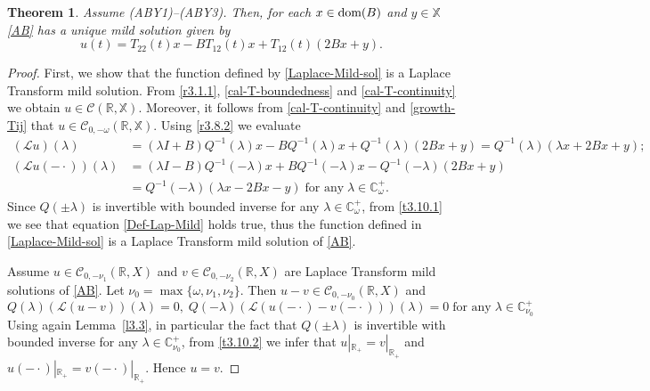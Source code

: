 \documentclass[11pt]{amsart}
\numberwithin{equation}{section}
\newtheorem{theorem}{Theorem}[section]
\theoremstyle{remark}
\theoremstyle{definition}
\newcommand\bX{{\mathbb X}}
\newcommand{\dom}{\text{\rm{dom}}}
\begin{document}
\begin{theorem}\label{t3.10}
	Assume \textnormal{(ABY1)--(ABY3)}. Then, for each $x \in \dom(B)$ and $y \in \bX$ \eqref{AB} has a unique mild solution given by
	\begin{equation}\label{Laplace-Mild-sol}
		u(t) = T_{22}(t)x - BT_{12}(t)x + T_{12}(t)(2Bx+y). 
	\end{equation}
\end{theorem}
\begin{proof}
First, we show that the function defined by \eqref{Laplace-Mild-sol} is a Laplace Transform mild solution. From \eqref{r3.1.1}, \eqref{cal-T-boundedness} and \eqref{cal-T-continuity} we obtain $u \in \mathcal{C}(\mathbb{R}, \bX)$. Moreover, it follows from \eqref{cal-T-continuity} and \eqref{growth-Tij} that $u \in \mathcal{C}_{0,-\omega}(\mathbb{R},\bX)$. Using \eqref{r3.8.2} we evaluate
\begin{align}\label{t3.10.1}
(\mathcal{L}u)(\lambda)
&= (\lambda I+B)Q^{-1}(\lambda)x - BQ^{-1}(\lambda)x + Q^{-1}(\lambda)(2Bx+y) = Q^{-1}(\lambda)(\lambda x + 2Bx + y);\nonumber\\ 
(\mathcal{L}u(-\cdot))(\lambda)
&= (\lambda I-B)Q^{-1}(-\lambda)x + BQ^{-1}(-\lambda)x - Q^{-1}(-\lambda)(2Bx+y)\nonumber\\&= Q^{-1}(-\lambda)(\lambda x - 2Bx - y)\;\mbox{for any}\;\lambda \in \mathbb{C}_\omega^+.
\end{align}
Since $Q(\pm\lambda)$ is invertible with bounded inverse for any $\lambda \in \mathbb{C}_\omega^+$, from \eqref{t3.10.1} we see that equation \eqref{Def-Lap-Mild} holds true, thus the function defined in \eqref{Laplace-Mild-sol} is a Laplace Transform mild solution of \eqref{AB}.
	
Assume $u \in \mathcal{C}_{0,-\nu_1}(\mathbb{R},X)$ and $v \in \mathcal{C}_{0,-\nu_2}(\mathbb{R},X)$ are Laplace Transform mild solutions of \eqref{AB}. Let $\nu_0 = \max\{\omega, \nu_1, \nu_2\}$. Then $u - v \in \mathcal{C}_{0,-\nu_0}(\mathbb{R},X)$ and
	\begin{equation}\label{t3.10.2}
		Q(\lambda)(\mathcal{L}(u-v))(\lambda) = 0,\; Q(-\lambda)(\mathcal{L}(u(-\cdot)-v(-\cdot)))(\lambda) = 0\;\mbox{for any}\;\lambda \in \mathbb{C}_{\nu_0}^+
	\end{equation}
	Using again Lemma~\ref{l3.3}, in particular the fact that $Q(\pm\lambda)$ is invertible with bounded inverse for any $\lambda \in \mathbb{C}_{\nu_0}^+$, from \eqref{t3.10.2} we infer that $u|_{\mathbb{R}_+} = v|_{\mathbb{R}_+}$ and $u(-\cdot)|_{\mathbb{R}_+} = v(-\cdot)|_{\mathbb{R}_+}$. Hence $u = v$.
\end{proof}
\end{document}

